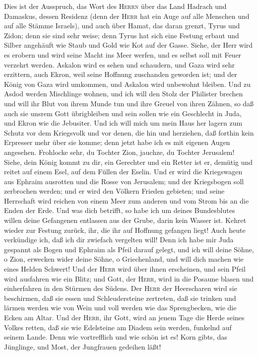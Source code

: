 Dies ist der Ausspruch, das Wort des \textsc{Herrn} über
das Land Hadrach und Damaskus, dessen Residenz (denn der \textsc{Herr}
hat ein Auge auf alle Menschen und auf alle Stämme Israels),
 und auch über Hamat, das daran grenzt, Tyrus und Zidon;
denn sie sind sehr weise;  denn Tyrus hat sich eine
Festung erbaut und Silber angehäuft wie Staub und Gold wie Kot auf der
Gasse.  Siehe, der Herr wird es erobern und wird seine
Macht ins Meer werfen, und es selbst soll mit Feuer verzehrt werden.
 Askalon wird es sehen und schaudern, und Gaza wird sehr
erzittern, auch Ekron, weil seine Hoffnung zuschanden geworden ist; und
der König von Gaza wird umkommen, und Askalon wird unbewohnt bleiben.
 Und zu Asdod werden Mischlinge wohnen, und ich will den
Stolz der Philister brechen  und will ihr Blut von ihrem
Munde tun und ihre Greuel von ihren Zähnen, so daß auch sie unsrem Gott
übrigbleiben und sein sollen wie ein Geschlecht in Juda, und Ekron wie
die Jebusiter.  Und ich will mich um mein Haus her lagern
zum Schutz vor dem Kriegsvolk und vor denen, die hin und herziehen, daß
forthin kein Erpresser mehr über sie komme; denn jetzt habe ich es mit
eigenen Augen angesehen.  Frohlocke sehr, du Tochter Zion,
jauchze, du Tochter Jerusalem! Siehe, dein König kommt zu dir, ein
Gerechter und ein Retter ist er, demütig und reitet auf einem Esel, auf
dem Füllen der Eselin.  Und er wird die Kriegswagen aus
Ephraim ausrotten und die Rosse von Jerusalem; und der Kriegsbogen soll
zerbrochen werden; und er wird den Völkern Frieden gebieten; und seine
Herrschaft wird reichen von einem Meer zum anderen und vom Strom bis an
die Enden der Erde.  Und was dich betrifft, so habe ich
um deines Bundesblutes willen deine Gefangenen entlassen aus der Grube,
darin kein Wasser ist.  Kehret wieder zur Festung zurück,
ihr, die ihr auf Hoffnung gefangen liegt! Auch heute verkündige ich, daß
ich dir zwiefach vergelten will!  Denn ich habe mir Juda
gespannt als Bogen und Ephraim als Pfeil darauf gelegt, und ich will
deine Söhne, o Zion, erwecken wider deine Söhne, o Griechenland, und
will dich machen wie eines Helden Schwert!  Und der
\textsc{Herr} wird über ihnen erscheinen, und sein Pfeil wird ausfahren
wie ein Blitz; und Gott, der \textsc{Herr}, wird in die Posaune blasen
und einherfahren in den Stürmen des Südens.  Der
\textsc{Herr} der Heerscharen wird sie beschirmen, daß sie essen und
Schleudersteine zertreten, daß sie trinken und lärmen werden wie von
Wein und voll werden wie das Sprengbecken, wie die Ecken am Altar.
 Und der \textsc{Herr}, ihr Gott, wird an jenem Tage die
Herde seines Volkes retten, daß sie wie Edelsteine am Diadem sein
werden, funkelnd auf seinem Lande.  Denn wie vortrefflich
und wie schön ist es! Korn gibt\textquotesingle s, das Jünglinge, und
Most, der Jungfrauen gedeihen läßt!

